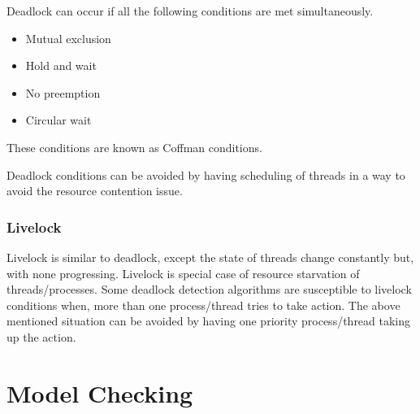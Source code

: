 Deadlock can occur if all the following conditions are met simultaneously.

\begin{itemize}
\item	Mutual exclusion
\item	Hold and wait
\item	No preemption
\item	Circular wait
\end{itemize}

These conditions are known as Coffman conditions\cite{coffman_cond}.

Deadlock conditions can be avoided by having scheduling of threads in a way to avoid the resource contention issue.

\subsubsection{Livelock}

Livelock is similar to deadlock, except the state of threads change constantly but, with none progressing. 
Livelock is special case of resource starvation of threads/processes. 
Some deadlock detection algorithms are susceptible to livelock conditions when, more than one process/thread tries to take action\cite{lopez2017study}\cite{chaki2005concurrent}. 
The above mentioned situation can be avoided by having one priority process/thread taking up the action. 

\section{Model Checking}


